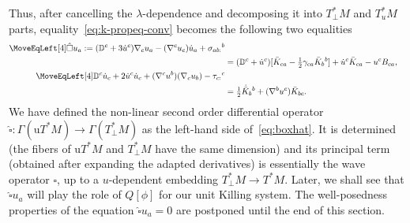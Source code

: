\documentclass[a4paper]{article}
\theoremstyle{remark}
\newcommand{\Secs}{\Gamma}
\newcommand{\la}{\lambda}
\newcommand{\D}{\mathbb{D}}
\begin{document}
Thus, after cancelling the $\la$-dependence and decomposing it into
$T_{\perp}^*M$ and $T_u^*M$ parts, equality~\eqref{eq:k-propeq-conv}
becomes the following two equalities
\begin{align}
	\notag
	\MoveEqLeft[4]
	\hat{\square} u_a
	:= (\D^c + 3\dot{u}^c) \nabla_c u_a
		- (\nabla^c u_c) \dot{u}_a + \sigma_{ab:}{}^b
	\\ \label{eq:boxhat}
	&= (\D^c + \dot{u}^c)
		[\bar{K}_{ca} - \tfrac{1}{2} \gamma_{ca} \bar{K}_b{}^b]
		+ \dot{u}^c \bar{K}_{ca}
		- u^c B_{ca}
	,
	\\ \notag
	\MoveEqLeft[4]
	\D^c \dot{u}_c + 2\dot{u}^c \dot{u}_c + (\nabla^c u^b) (\nabla_c u_b) 
		- \tau_{c:}{}^c
	\\ \label{eq:boxparl}
	&= \tfrac{1}{2} \dot{\bar{K}}_b{}^b + (\nabla^b u^c) \bar{K}_{bc} 
	.
\end{align}
We have defined the non-linear second order differential operator
$\hat{\square} \colon \Secs(\mathrm{u}T^*M) \to \Secs(T^*_{\perp} M)$ as
the left-hand side of~\eqref{eq:boxhat}. It is determined (the fibers of
$\mathrm{u}T^*M$ and $T_{\perp}^*M$ have the same dimension) and its
principal term (obtained after expanding the adapted derivatives) is
essentially the wave operator $\square$, up to a $u$-dependent embedding
$T_{\perp}^*M \to T^*M$. Later, we shall see that $\hat{\square} u_a$
will play the role of $Q[\phi]$ for our unit Killing system. The
well-posedness properties of the equation $\hat{\square} u_a = 0$ are
postponed until the end of this section.
\end{document}
